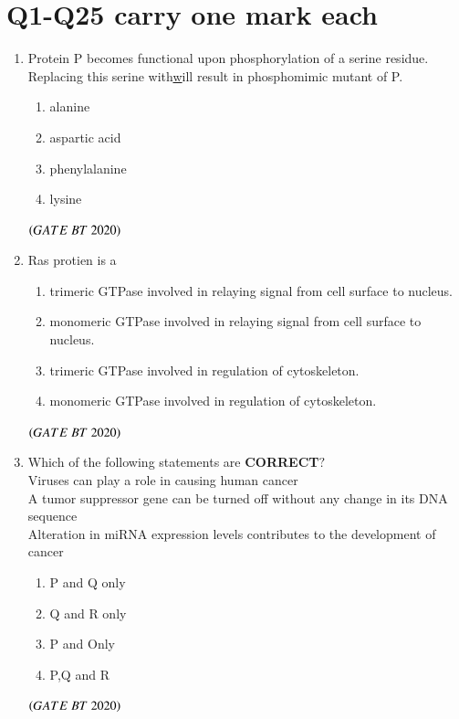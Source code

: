 \documentclass[journal,12pt,onecolumn]{IEEEtran}
\theoremstyle{remark}
\begin{document}
\section{Q1-Q25 carry one mark each}
\begin{enumerate}[label=Q\arabic*:]
\item Protein P becomes functional upon phosphorylation of a serine residue. Replacing this serine with\underline will result in phosphomimic mutant of P.
\begin{multicols}{4}
\begin{enumerate}
\item\;alanine
\item\;aspartic acid
\item\;phenylalanine
\item\;lysine
\end{enumerate}
\end{multicols} \hfill$\left(GATE\ BT\ 2020\right)$

\item Ras protien is a
\begin{multicols}{2}
\begin{enumerate}
\item\;trimeric GTPase involved in relaying signal from cell surface to nucleus.
\item\;monomeric GTPase involved in relaying signal from cell surface to nucleus.
\item\;trimeric GTPase involved in regulation of cytoskeleton.
\item\;monomeric GTPase involved in regulation of cytoskeleton. 
\end{enumerate}
\end{multicols}
\hfill$\left(GATE\ BT\ 2020\right)$

\item Which of the following statements are \textbf{CORRECT}$?$\\
Viruses can play a role in causing human cancer\\
A tumor suppressor gene can be turned off without any change in its DNA sequence\\
 Alteration in miRNA expression levels contributes to the development of cancer
\begin{multicols}{2}
\begin{enumerate}

\item\;P and Q only
\item\;Q and R only
\item\;P and Only
\item\;P,Q and R
\end{enumerate}
\end{multicols}
\hfill$\left(GATE\ BT\ 2020\right)$


\end{enumerate}
\end{document}
